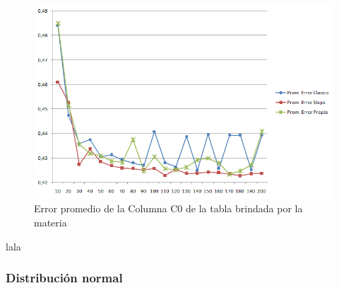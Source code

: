 \begin{itemize}
\begin{figure}[H]
	  \begin{center}
	    \includegraphics[scale=.80]{imagenes/parametroVariableC0Greater.png}
	    \caption{Error promedio de la Columna C0 de la tabla brindada por la materia} 
	    \label{fig:C2_variando_valor}
	  \end{center}
\end{figure}

\quad lala \\

\end{itemize}

\subsubsection{Distribuci\'on normal}


